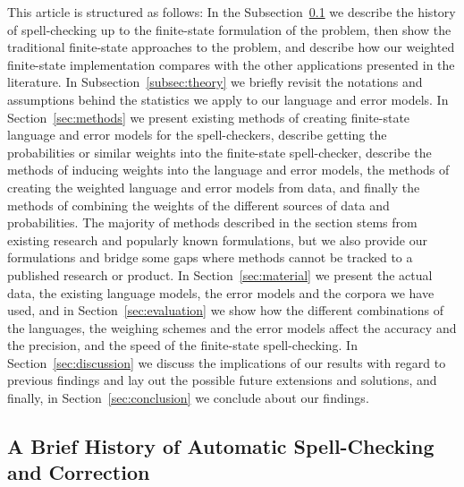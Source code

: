 \documentclass[a4paper,12pt]{article}
\begin{document}
This article is structured as follows: In the Subsection~\ref{subsec:background} we describe the history of spell-checking up
to the finite-state formulation of the problem, then show the traditional
finite-state approaches to the problem, and describe how our weighted
finite-state implementation compares with the other applications presented in
the literature. In Subsection~\ref{subsec:theory} we briefly revisit the
notations and assumptions behind the statistics we apply to our language and
error models. In Section~\ref{sec:methods} we present existing methods of
creating finite-state language and error models for the spell-checkers,
describe getting the probabilities or similar weights into the finite-state
spell-checker, describe the methods of inducing weights into the language and
error models, the methods of creating the weighted language and error models
from data, and finally the methods of combining the weights of the different
sources of data and probabilities. The majority of methods described in the
section stems from existing research and popularly known formulations, but we
also provide our formulations and bridge some gaps where methods cannot be
tracked to a published research or product. In Section~\ref{sec:material} we
present the actual data, the existing language models, the error models and the
corpora we have used, and in Section~\ref{sec:evaluation} we show how the
different combinations of the languages, the weighing schemes and the error
models affect the accuracy and the precision, and the speed of the finite-state
spell-checking. In Section~\ref{sec:discussion} we discuss the implications of our
results with regard to previous findings and lay out the possible future
extensions and solutions, and finally, in Section~\ref{sec:conclusion} we
conclude about our findings.

\subsection{A Brief History of Automatic Spell-Checking and Correction}
\label{subsec:background}
\end{document}

